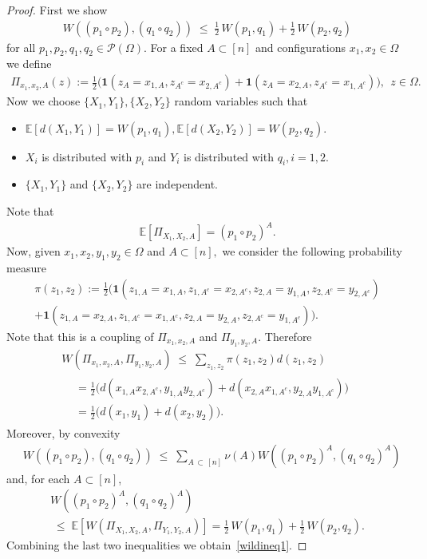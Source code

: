 \documentclass[AHL,Unicode,longabstracts,published]{cedram}
\renewcommand{\leq}{\;\leqslant\;}
\newcommand{\Om}{\Omega}
\newcommand{\IND}{\mathbf{1}}
\newcommand{\cP}{\mathcal{P}}
\newcommand{\bbE}{\mathbb{E}}
\let\O=\Omega
\begin{document}
\begin{proof}
First we show
\begin{align}\label{wildineq1}
W\left((p_1 \circ p_2),(q_1 \circ q_2)\right)\leq \tfrac{1}{2}\,W\left(p_1,q_1\right) + \tfrac{1}{2}\,W\left(p_2,q_2\right)
\end{align}
for all $p_1,p_2,q_1,q_2 \in \cP(\O).$ For a fixed $A \subset [n]$ and configurations $x_1, x_2 \in \Om$ we define
\begin{align*}
\Pi_{x_1,x_2,A}(z) := \tfrac{1}{2}\big(\IND(z_A = x_{1,A}, z_{A^c}=x_{2,A^c})+\IND(z_A = x_{2,A}, z_{A^c}=x_{1,A^c})\big), \ \ z \in \Om.
\end{align*}
Now we choose $\{X_1,Y_1\}, \{X_2,Y_2\}$ random variables such that
\begin{itemize}
\item $\bbE[d(X_1,Y_1)] = W(p_1,q_1), \bbE[d(X_2,Y_2)] = W(p_2,q_2).$
\item $X_i$ is distributed with $p_i$ and $Y_i$ is distributed with $q_i, i=1,2.$
\item $\{X_1, Y_1\}$ and $\{X_2, Y_2\}$ are independent.
\end{itemize}
Note that
\begin{align}
\bbE\left[\Pi_{X_1,X_2,A}\right] = \left(p_1 \circ p_2\right)^A.
\end{align}
Now, given $x_1, x_2, y_1, y_2 \in \Om$ and $A \subset [n],$ we consider the following probability measure
\begin{multline*}
\pi(z_1,z_2):= \tfrac{1}{2}\big(\IND(z_{1,A}=x_{1,A}, z_{1,A^c}=x_{2,A^c},z_{2,A}=y_{1,A}, z_{2,A^c}=y_{2,A^c}) \\
 + \IND(z_{1,A}=x_{2,A},z_{1,A^c}=x_{1,A^c},z_{2,A}=y_{2,A}, z_{2,A^c}=y_{1,A^c})\big).
\end{multline*}
Note that this is a coupling of $\Pi_{x_1,x_2,A}$ and $\Pi_{y_1,y_2,A}.$ Therefore
\begin{multline} \label{wassineq}
W\left(\Pi_{x_1,x_2,A},\Pi_{y_1,y_2,A}\right)\leq \sum_{z_1,z_2}\pi(z_1,z_2)d(z_1,z_2)\\
\begin{aligned}
&=\tfrac{1}{2}\big(d(x_{1,A}x_{2,A^c},y_{1,A}y_{2,A^c})+d(x_{2,A}x_{1,A^c},y_{2,A}y_{1,A^c})\big) \\
&=\tfrac{1}{2}\big(d(x_1,y_1)+d(x_2,y_2)\big).
\end{aligned}
\end{multline}
Moreover, by convexity
\begin{align}
&W\left((p_1\circ p_2),(q_1 \circ q_2)\right) \leq \sum_{A\,\subset\,[n]}\nu(A)W\left((p_1\circ p_2)^A,(q_1 \circ q_2)^A\right)
\end{align}
and, for each $A \subset [n]$,
\begin{multline}\label{wildineq1overA}
W\left((p_1\circ p_2)^A,(q_1 \circ q_2)^A\right) \\
\leq \bbE\left[W\left(\Pi_{X_1,X_2,A},\Pi_{Y_1,Y_2,A}\right)\right] =\tfrac{1}{2}\,W(p_1,q_1) + \tfrac{1}{2}\,W(p_2,q_2).
\end{multline}
Combining the last two inequalities we obtain~\eqref{wildineq1}.


\end{proof}
\end{document}
